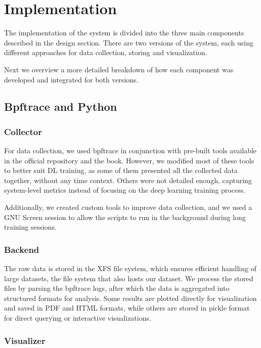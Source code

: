 \documentclass[conference]{IEEEtran}
\begin{document}
\section{Implementation}
The implementation of the system is divided into the three main components described in the design section.
There are two versions of the system, each using different approaches for data collection, storing and visualization.

Next we overview a more detailed breakdown of how each component was developed and integrated for both versions.

\subsection{Bpftrace and Python}

\subsubsection{Collector}

For data collection, we used bpftrace\cite{bpftrace} in conjunction with pre-built tools available in the official repository and the book\cite{bgreggBook}.
However, we modified most of these tools to better suit DL training, as some of them presented all the collected data together, without any time context.
Others were not detailed enough, capturing system-level metrics instead of focusing on the deep learning training process.

Additionally, we created custom tools to improve data collection, and we used a GNU Screen \cite{screen} session to allow the scripts to run in the background during long training sessions.

\subsubsection{Backend}

The raw data is stored in the XFS file system, which ensures efficient handling of large datasets, the file system that also hosts our dataset.
We process the stored files by parsing the bpftrace logs, after which the data is aggregated into structured formats for analysis.
Some results are plotted directly for visualization and saved in PDF and HTML formats, while others are stored in pickle format for direct querying or interactive visualizations.

\subsubsection{Visualizer}
\end{document}

